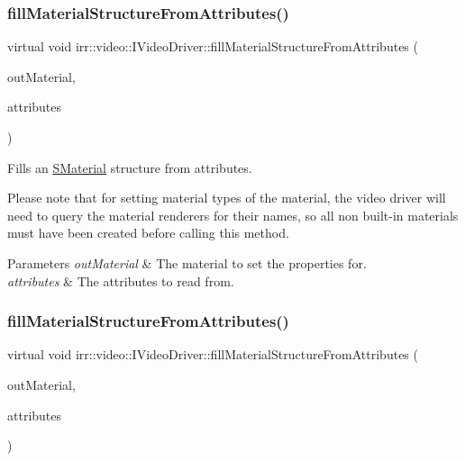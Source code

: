 \subsubsection{\texorpdfstring{fill\+Material\+Structure\+From\+Attributes()}{fillMaterialStructureFromAttributes()}\hspace{0.1cm}{\footnotesize\ttfamily [1/2]}}
{\footnotesize\ttfamily virtual void irr\+::video\+::\+I\+Video\+Driver\+::fill\+Material\+Structure\+From\+Attributes (\begin{DoxyParamCaption}\item[{\hyperlink{classirr_1_1video_1_1SMaterial}{video\+::\+S\+Material} \&}]{out\+Material,  }\item[{\hyperlink{classirr_1_1io_1_1IAttributes}{io\+::\+I\+Attributes} $\ast$}]{attributes }\end{DoxyParamCaption})\hspace{0.3cm}{\ttfamily [pure virtual]}}



Fills an \hyperlink{classirr_1_1video_1_1SMaterial}{S\+Material} structure from attributes. 

Please note that for setting material types of the material, the video driver will need to query the material renderers for their names, so all non built-\/in materials must have been created before calling this method. 
\begin{DoxyParams}{Parameters}
{\em out\+Material} & The material to set the properties for. \\
\hline
{\em attributes} & The attributes to read from. \\
\hline
\end{DoxyParams}
\mbox{\label{classirr_1_1video_1_1IVideoDriver_a9b7b5942cf2378f9f96d47ec7a0cd881}} 
\subsubsection{\texorpdfstring{fill\+Material\+Structure\+From\+Attributes()}{fillMaterialStructureFromAttributes()}\hspace{0.1cm}{\footnotesize\ttfamily [2/2]}}
{\footnotesize\ttfamily virtual void irr\+::video\+::\+I\+Video\+Driver\+::fill\+Material\+Structure\+From\+Attributes (\begin{DoxyParamCaption}\item[{\hyperlink{classirr_1_1video_1_1SMaterial}{video\+::\+S\+Material} \&}]{out\+Material,  }\item[{\hyperlink{classirr_1_1io_1_1IAttributes}{io\+::\+I\+Attributes} $\ast$}]{attributes }\end{DoxyParamCaption})\hspace{0.3cm}{\ttfamily [pure virtual]}}



